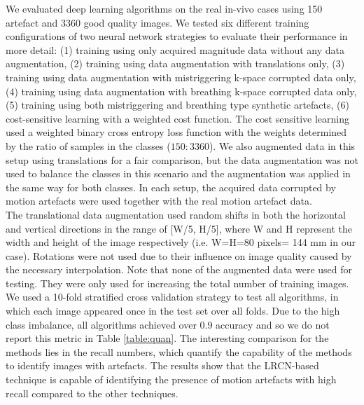 \documentclass[preprint,12pt,authoryear]{elsarticle}
\begin{document}
We evaluated deep learning algorithms on the real in-vivo cases using 150 artefact and 3360 good quality  images. We tested six different training configurations of two neural network strategies to evaluate their performance in more detail: (1) training using only acquired magnitude data without any data augmentation, (2) training using data augmentation with translations only, (3) training using data augmentation with mistriggering k-space corrupted data only, (4) training using data augmentation with breathing k-space corrupted data only, (5) training using both mistriggering and breathing type synthetic artefacts, (6) cost-sensitive learning with a weighted cost function.  The cost sensitive learning used a weighted binary cross entropy loss function with the weights determined by the ratio of samples in the classes ($150:3360$). We also augmented data in this setup using translations for a fair comparison, but the data augmentation was not used to balance the classes in this scenario and the augmentation was applied in the same way for both classes. In each setup, the acquired data corrupted by motion artefacts were used together with the real motion artefact data.\\

The translational data augmentation used random shifts in both the horizontal and vertical directions in the range of [W/5, H/5], where W and H represent the width and height of the image respectively (i.e. W=H=80 pixels= 144 mm in our case). Rotations were not used due to their influence on image quality caused by the necessary interpolation. Note that none of the augmented data were used for testing. They were only used for increasing the total number of training images.\\

We used a 10-fold stratified cross validation strategy to test all algorithms, in which each image appeared once in the test set over all folds. Due to the high class imbalance, all algorithms achieved over 0.9 accuracy and so we do not report this metric in Table \ref{table:quan}. %
The interesting comparison for the methods lies in the recall numbers, which quantify the capability of the methods to identify images with artefacts. The results show that the LRCN-based technique is capable of identifying the presence of motion artefacts with high recall compared to the other techniques.
\end{document}
